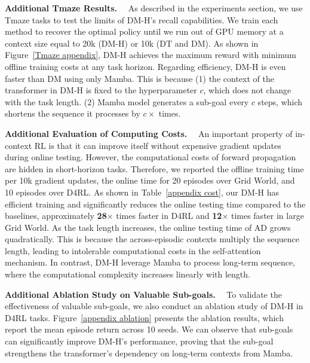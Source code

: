 \noindent\textbf{Additional Tmaze Results.}~~
As described in the experiments section, we use Tmaze tasks to test the limits of DM-H's recall capabilities. We train each method to recover the optimal policy until we run out of GPU memory at a context size equal to 20k (DM-H) or 10k (DT and DM). As shown in Figure~\ref{Tmaze appendix}, DM-H achieves the maximum reward with minimum offline training costs at any task horizon. Regarding efficiency, DM-H is even faster than DM using only Mamba. This is because (1) the context of the transformer in DM-H is fixed to the hyperparameter $c$, which does not change with the task length. (2) Mamba model generates a sub-goal every $c$ steps, which shortens the sequence it processes by $c\times$ times. 

\noindent\textbf{Additional Evaluation of Computing Costs.}~~
An important property of in-context RL is that it can improve itself without expensive gradient updates during online testing. However, the computational costs of forward propagation are hidden in short-horizon tasks. Therefore, we reported the offline training time per 10k gradient updates, the online time for 20 episodes over Grid World, and 10 episodes over D4RL. As shown in Table~\ref{appendix cost}, our DM-H has efficient training and significantly reduces the online testing time compared to the baselines, approximately \textbf{28$\times$} times faster in D4RL and \textbf{12$\times$} times faster in large Grid World. As the task length increases, the online testing time of AD grows quadratically.
This is because the across-episodic contexts multiply the sequence length, leading to intolerable computational costs in the self-attention mechanism. In contrast, DM-H leverage Mamba to process long-term sequence, where the computational complexity increases linearly with length.

\noindent\textbf{Additional Ablation Study on Valuable Sub-goals.}~~
To validate the effectiveness of valuable sub-goals, we also conduct an ablation study of DM-H in D4RL tasks.
Figure~\ref{appendix ablation} presents the ablation results, which report the mean episode return across 10 seeds. We can observe that sub-goals can significantly improve DM-H's performance, proving that the sub-goal strengthens the transformer's dependency on long-term contexts from Mamba.

